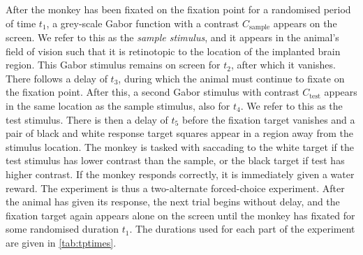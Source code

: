 After the monkey has been fixated on the fixation point for a randomised period of time
$t_1$,
a grey-scale Gabor function with a contrast $C_\text{sample}$ appears on the screen.
We refer to this as the \textit{sample stimulus}, and it appears in the animal's field of vision such that it is retinotopic to the location of the implanted brain region.
This Gabor stimulus remains on screen for $t_2$, after which it vanishes.
There follows a delay of $t_3$, during which the animal must continue to fixate on the fixation point.
After this, a second Gabor stimulus with contrast $C_\text{test}$ appears in the same location as the sample stimulus, also for $t_4$.
We refer to this as the test stimulus.
There is then a delay of $t_5$ before the fixation target vanishes and a pair of black and white response target squares appear in a region away from the stimulus location.
The monkey is tasked with saccading to the white target if the test stimulus has lower contrast than the sample, or the black target if test has higher contrast.
If the monkey responds correctly, it is immediately given a water reward.
The experiment is thus a two-alternate forced-choice experiment.
After the animal has given its response, the next trial begins without delay, and the fixation target again appears alone on the screen until the monkey has fixated for some randomised duration $t_1$.
The durations used for each part of the experiment are given in \autoref{tab:tptimes}.

